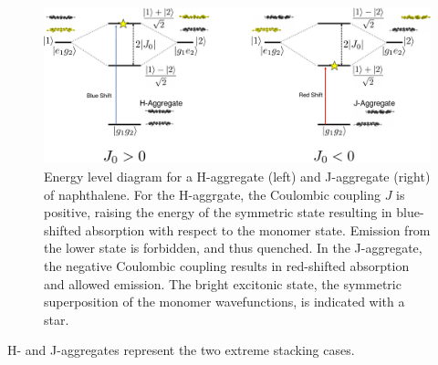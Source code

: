 \begin{figure}[t]
\centering
  \includegraphics[width=\linewidth]{1Intro/H_J_aggregates.pdf}
  \caption[Exciton energy level diagram for H- and J-aggregates]{Energy level diagram for a H-aggregate (left) and J-aggregate (right) of naphthalene. For the H-aggrgate, the Coulombic coupling $J$ is positive, raising the energy of the symmetric state resulting in blue-shifted absorption with respect to the monomer state. Emission from the lower state is forbidden, and thus quenched. In the J-aggregate, the negative Coulombic coupling results in red-shifted absorption and allowed emission. The bright excitonic state, the symmetric superposition of the monomer wavefunctions, is indicated with a star.}
  \label{figure: H_J_Aggregates}
\end{figure}

H- and J-aggregates represent the two extreme stacking cases. 

